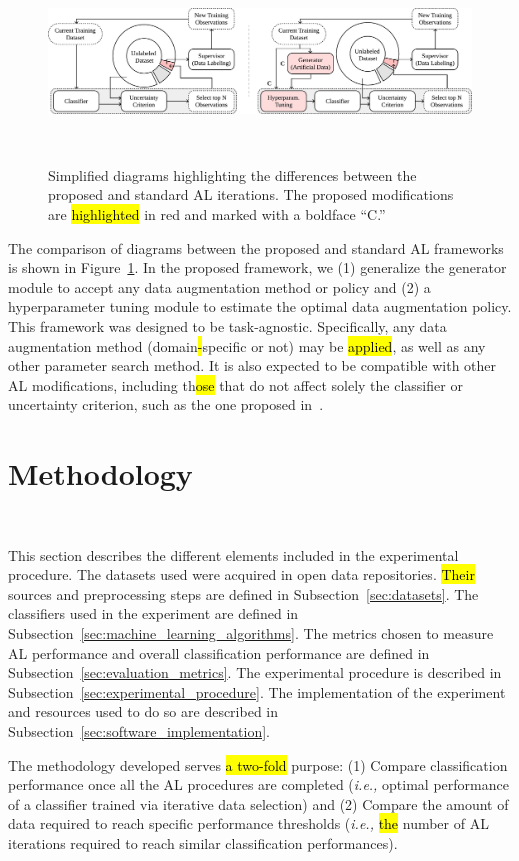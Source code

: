 \documentclass[preprint, 12pt]{elsarticle}
\begin{document}
\begin{figure}[H]
	\centering
	\includegraphics[width=\linewidth]{../analysis/al_comparison}
    \caption{%
        Simplified diagrams highlighting the differences between the proposed
        and standard AL iterations. The proposed modifications are \hl{highlighted}
        in red and marked with a boldface ``C.''
    }~\label{fig:al_comparison}
\end{figure}

The comparison of diagrams between the proposed and standard AL frameworks is
shown in Figure~\ref{fig:al_comparison}. In the proposed framework, we (1)
generalize the generator module to accept any data augmentation method or
policy and (2) a hyperparameter tuning module to estimate the optimal data
augmentation policy. This framework was designed to be task-agnostic.
Specifically, any data augmentation method (domain\hl{-}specific or not) may
be \hl{applied}, as well as any other parameter search method. It is also expected to
be compatible with other AL modifications, including th\hl{ose} that do not
affect solely the classifier or uncertainty criterion, such as the one
proposed in~\cite{Yoo2019}.
 
\section{Methodology}~\label{sec:methodology}

This section describes the different elements included in the experimental
procedure. The datasets used were acquired in open data repositories.
\hl{Their} sources and preprocessing steps are defined in
Subsection~\ref{sec:datasets}. The classifiers used in the experiment are
defined in Subsection~\ref{sec:machine_learning_algorithms}. The metrics
chosen to measure AL performance and overall classification performance are
defined in Subsection~\ref{sec:evaluation_metrics}. The experimental procedure
is described in Subsection~\ref{sec:experimental_procedure}. The
implementation of the experiment and resources used to do so are described in
Subsection~\ref{sec:software_implementation}.

The methodology developed serves \hl{a two-fold} purpose: (1) Compare classification
performance once all the AL procedures are completed (\textit{i.e.,} optimal
performance of a classifier trained via iterative data selection) and (2)
Compare the amount of data required to reach specific performance thresholds
(\textit{i.e.,} \hl{the} number of AL iterations required to reach similar
classification performances).
 
\end{document}
